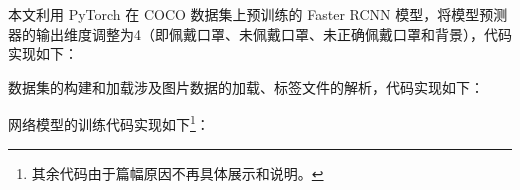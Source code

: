 本文利用 PyTorch 在 COCO 数据集上预训练的 Faster RCNN 模型，将模型预测器的输出维度调整为4（即佩戴口罩、未佩戴口罩、未正确佩戴口罩和背景），代码实现如下：

\vspace{0.3cm}


数据集的构建和加载涉及图片数据的加载、标签文件的解析，代码实现如下：

\vspace{0.3cm}


网络模型的训练代码实现如下\footnote{其余代码由于篇幅原因不再具体展示和说明。}：

\vspace{0.3cm}
